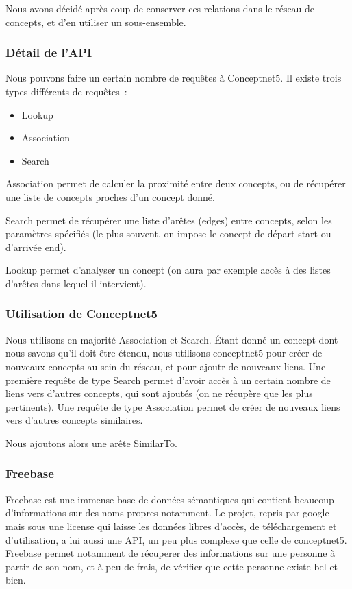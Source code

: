 \documentclass{article}           %
\begin{document}
Nous avons décidé après coup de conserver ces relations dans le réseau de concepts, et d'en utiliser un sous-ensemble.

\subsubsection{Détail de l'API}

Nous pouvons faire un certain nombre de requêtes à Conceptnet5. Il existe trois types différents de requêtes~:
\begin{itemize}
 \item Lookup
 \item Association
 \item Search
\end{itemize}
Association permet de calculer la proximité entre deux concepts, ou de récupérer une liste de concepts proches d'un concept donné.

Search permet de récupérer une liste d'arêtes (edges) entre concepts, selon les paramètres spécifiés (le plus souvent, on impose le concept de départ start ou d'arrivée end). 

Lookup permet d'analyser un concept (on aura par exemple accès à des listes d'arêtes dans lequel il intervient).


\subsubsection{Utilisation de Conceptnet5}

Nous utilisons en majorité Association et Search.
Étant donné un concept dont nous savons qu'il doit être étendu, nous utilisons conceptnet5 pour créer de nouveaux concepts au sein du réseau, et pour ajoutr de nouveaux liens. Une première requête de type Search permet d'avoir accès à un certain nombre de liens vers d'autres concepts, qui sont ajoutés (on ne récupère que les plus pertinents). Une requête de type Association permet de créer de nouveaux liens vers d'autres concepts similaires.

Nous ajoutons alors une arête SimilarTo.



    
\subsubsection{Freebase}

Freebase est une immense base de données sémantiques qui contient beaucoup d'informations sur des noms propres notamment. Le projet, repris par google mais sous une license qui laisse les données libres d'accès, de téléchargement et d'utilisation, a lui aussi une API, un peu plus complexe que celle de conceptnet5. Freebase permet notamment de récuperer des informations sur une personne à partir de son nom, et à peu de frais, de vérifier que cette personne existe bel et bien.
\end{document}
